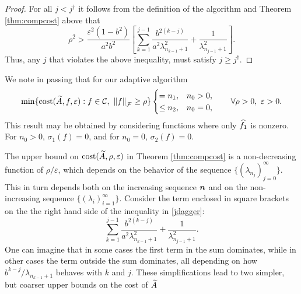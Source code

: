 \documentclass[final]{elsarticle}
\theoremstyle{definition}
\theoremstyle{remark}
\begin{document}
\begin{proof}
For all $j < j^\dagger$ it follows from the definition of the algorithm and Theorem \ref{thm:compcost} above that 
\begin{equation*}
\rho^2 > \frac{\varepsilon^2(1 - b^2)}{a^2b^2} \left[ \sum_{k=1}^{j-1} \frac{ b^{2(k-j)}}{a^{2}\lambda_{n_{k-1}+1}^2} + \frac{1}{\lambda_{n_{j-1}+1}^2}\right].
\end{equation*}
Thus, any $j$ that violates the above inequality, must satisfy $j \ge j^\dagger$.
\end{proof}

We note in passing that for our adaptive algorithm
\begin{equation*}
 \min \{\cost(\tA,f,\varepsilon) : f \in \cc, \ \norm[\cf]{f} \ge \rho \} 
 \begin{cases} = n_1, & n_0 > 0, \\
 \le n_2, & n_0 = 0, 
 \end{cases}
 \qquad \forall \rho > 0, \ \varepsilon > 0.
\end{equation*}
This result may be obtained by considering functions where only $\widehat{f}_1$ is nonzero.  For $n_0 > 0$, $\sigma_1(f) = 0$, and for $n_0 = 0$, $\sigma_2(f) = 0$.

The upper bound on $\operatorname{cost}(\widetilde{A},\rho,\varepsilon)$ in Theorem \ref{thm:compcost}  is a non-decreasing function of $\rho/\varepsilon$, which depends on the behavior of the sequence $\{(\lambda_{n_j})_{j=0}^\infty\}$.  This in turn depends both on the increasing sequence $\boldsymbol{n}$ and on the non-increasing sequence $\{(\lambda_i)_{i=1}^\infty\}$. Consider the  term enclosed in square brackets on the the right hand side of the inequality in \eqref{jdagger}: \begin{equation} \label{keysum}
\sum_{k=1}^{j-1} \frac{b^{2(k-j)}}{a^2\lambda_{n_{k-1}+1}^2} + \frac{1}{\lambda_{n_{j-1}+1}^2}.
\end{equation}
One can imagine that in some cases the first term in the sum dominates, while in other cases the term outside the sum dominates, all depending on how $b^{k-j}/\lambda_{n_{k-1}+1}$ behaves with $k$ and $j$.  These simplifications lead to two simpler, but coarser upper bounds on the cost of $\widetilde{A}$
\end{document}

